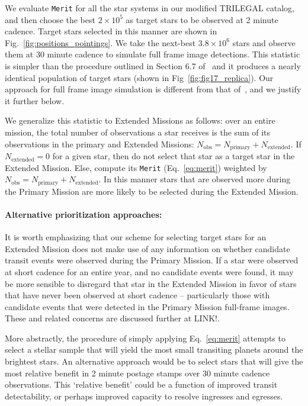 We evaluate \texttt{Merit} for all the star systems in our modified
TRILEGAL catalog, and then choose the best $2\times10^5$ as target
stars to be observed at 2 minute cadence.  Target stars selected in
this manner are shown in Fig.~\ref{fig:positions_pointings}.  We take
the next-best $3.8\times10^6$ stars and observe them at 30 minute
cadence to simulate full frame image detections.  This statistic is
simpler than the procedure outlined in Section 6.7
of~ and it produces a nearly identical
population of target stars (shown in Fig~\ref{fig:fig17_replica}).
Our approach for full frame image simulation is different from that
of~, and we justify it further below.

We generalize this statistic to Extended Missions as follows: over an
entire mission, the total number of observations a star receives is
the sum of its observations in the primary and Extended Missions:
$N_\text{obs}=N_\text{primary}+N_\text{extended}$.  If
$N_\text{extended}=0$ for a given star, then do not select that star as a
target star in the Extended Mission.  Else, compute its \texttt{Merit}
(Eq.~\ref{eq:merit}) weighted by
$N_\text{obs}=N_\text{primary}+N_\text{extended}$.  In this manner
stars that are observed more during the Primary Mission are more
likely to be selected during the Extended Mission.
 

\paragraph{Alternative prioritization approaches:}

It is worth emphasizing that our scheme for selecting target stars for
an Extended Mission does not make use of any information on whether
candidate transit events were observed during the Primary Mission.  If
a star were observed at short cadence for an entire year, and no
candidate events were found, it may be more sensible to disregard that
star in the Extended Mission in favor of stars that have never been
observed at short cadence -- particularly those with candidate events
that were detected in the Primary Mission full-frame images.  These
and related concerns are discussed further at LINK!.

More abstractly, the procedure of simply applying Eq.~\ref{eq:merit}
attempts to select a stellar sample that will yield the most small
transiting planets around the brightest stars.  An alternative
approach would be to select stars that will give the most relative
benefit in 2 minute postage stamps over 30 minute cadence
observations.  This `relative benefit' could be a function of improved
transit detectability, or perhaps improved capacity to resolve
ingresses and egresses.

